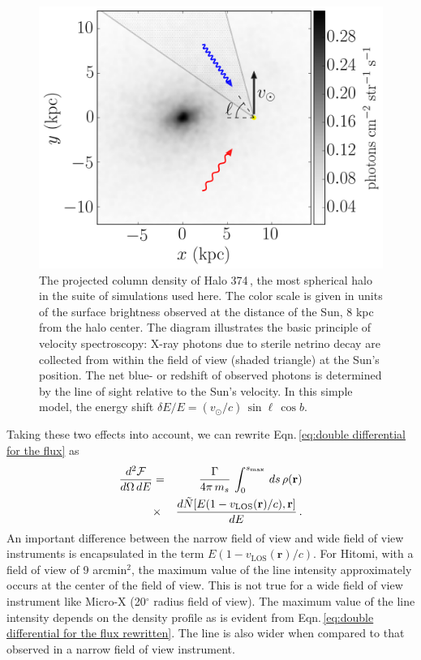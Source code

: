 \documentclass[aps,prd,10pt,twocolumn,superscriptaddress,showpacs,footinbib]{revtex4-1}
\newcommand{\br}[0]{\mathbf{r}}
\newcommand{\los}[0]{\mathrm{LOS}}
\begin{document}
\begin{figure}[!h]
\centering
\includegraphics[width=0.99\columnwidth]{vspec_diagram.png}
\caption{The projected column density of Halo 374\,\cite{mao2015}, the most spherical halo in the suite of	simulations used here. The color scale is given in units of the surface brightness observed at the distance of the Sun, 8 kpc from the halo center. The diagram illustrates the basic principle of velocity spectroscopy: X-ray photons due to sterile netrino decay are collected from within the field of view (shaded triangle) at the Sun's position. The net blue- or redshift of observed photons is determined by the line of sight relative to the Sun's velocity. In this simple model, the energy shift $\delta E/E=(v_\odot/c)\,\sin\ell\,\cos b$.}
\label{fig:halo374}
\end{figure}

Taking these two effects into account, we can rewrite Eqn.\,\ref{eq:double differential for the flux} as 
\begin{eqnarray}
\dfrac{d^2 \mathcal{F}}{d\Omega \, dE} &=&  \dfrac{\Gamma}{4\pi \, m_s} \, \int _0 ^{s_{\rm
max}}  \, ds \, \rho(\br) \nonumber\\
&\times& \dfrac{d \tilde{N}[E(1 - v_\los(\br)/c), \br]}{dE} \,.
\label{eq:double differential for the flux rewritten}
\end{eqnarray}
An important difference between the narrow field of view and wide field of view instruments is
encapsulated in the term $E(1 - v_\los(\br)/c)$.  For Hitomi, with a field of view of 9 arcmin$^2$, the maximum value of the line intensity approximately occurs at the center of the field of view.  This is not true for a wide field of view instrument like Micro-X (20$^\circ$ radius field of view).  The maximum value of the line intensity depends on the density profile as is evident from Eqn.\,\ref{eq:double differential for the flux rewritten}.  The line is also wider when compared to that observed in a narrow field of view instrument.    
\end{document}
